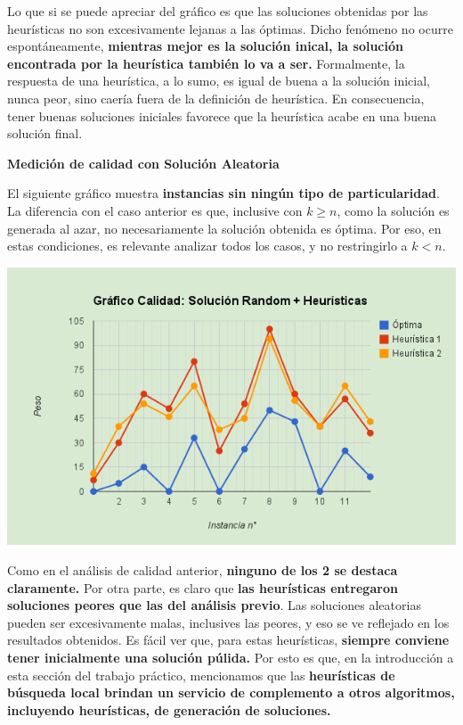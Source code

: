 \documentclass[10pt,a4paper]{article}
\begin{document}
Lo que si se puede apreciar del gráfico es que las soluciones obtenidas por las heurísticas no son excesivamente lejanas a las óptimas. Dicho fenómeno no ocurre espontáneamente, \textbf{mientras mejor es la solución inical, la solución encontrada por la heurística también lo va a ser.} Formalmente, la respuesta de una heurística, a lo sumo, es igual de buena a la solución inicial, nunca peor, sino caería fuera de la definición de heurística. En consecuencia, tener buenas soluciones iniciales favorece que la heurística acabe en una buena solución final.

\noindent \textbf{Medición de calidad con Solución Aleatoria}

El siguiente gráfico muestra \textbf{instancias sin ningún tipo de particularidad}. La diferencia con el caso anterior es que, inclusive con $k \geq n$, como la solución es generada al azar, no necesariamente la solución obtenida es óptima. Por eso, en estas condiciones, es relevante analizar todos los casos, y no restringirlo a $k < n$.

\includegraphics[scale=0.45]{grafico_calicad_greedy_random.png}

Como en el análisis de calidad anterior, \textbf{ninguno de los 2 se destaca claramente.} Por otra parte, es claro que \textbf{las heurísticas entregaron soluciones peores que las del análisis previo}. Las soluciones aleatorias pueden ser excesivamente malas, inclusives las peores, y eso se ve reflejado en los resultados obtenidos. Es fácil ver que, para estas heurísticas, \textbf{siempre conviene tener inicialmente una solución púlida.} Por esto es que, en la introducción a esta sección del trabajo práctico, mencionamos que las \textbf{heurísticas de búsqueda local brindan un servicio de complemento a otros algoritmos, incluyendo heurísticas, de generación de soluciones.} 
\newpage
\end{document}
